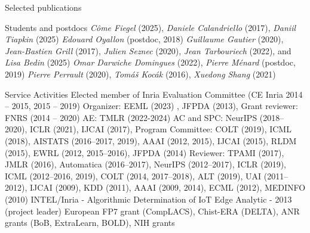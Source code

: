 \documentclass{resume}
\begin{document}
\begin{category}{Selected publications}



  

\end{category}
\vspace{-0.5cm}
\begin{category}{Students and postdocs}
\citemnobullet 
\textit{C\^{o}me Fiegel} (2025),
\textit{Daniele Calandriello} (2017), 
\textit{Daniil Tiapkin} (2025) 
\textit{Edouard Oyallon} (postdoc, 2018)
\textit{Guillaume Gautier} (2020),
\textit{Jean-Bastien Grill} (2017), 
\textit{Julien Seznec} (2020), 
\textit{Jean Tarbouriech} (2022), and
\textit{Lisa Bedin} (2025) 
\textit{Omar Darwiche Domingues} (2022), 
\textit{Pierre M\'enard} (postdoc, 2019)
\textit{Pierre Perrault} (2020), 
\textit{Tom\'a\v s Koc\' ak} (2016),
\textit{Xuedong Shang} (2021)

\end{category}
\vspace{-0.5cm}
\begin{category}{Service Activities}
\setlength\itemsep{0.15em}
\citembullet Elected member of Inria Evaluation Committee (CE Inria 2014 -- 2015, 2015 -- 2019)
\citembullet Organizer: EEML (2023) , JFPDA (2013),  Grant reviewer: FNRS (2014 -- 2020)
\citembullet AE: TMLR (2022-2024) AC and SPC: NeurIPS (2018--2020), ICLR (2021),  IJCAI (2017), Program Committee: COLT (2019), ICML (2018), AISTATS (2016--2017, 2019), AAAI (2012, 2015), IJCAI (2015), RLDM (2015), EWRL 
(2012, 2015--2016), JFPDA (2014)
\citembullet  Reviewer: TPAMI (2017), JMLR (2016), Automatica (2016--2017), NeurIPS (2012--2017), ICLR (2019), ICML (2012--2016, 2019), COLT
(2014, 2017--2018), ALT (2019), UAI (2011--2012), IJCAI (2009), KDD (2011), AAAI (2009, 2014), ECML
(2012), MEDINFO (2010)
\citembullet INTEL/Inria - Algorithmic Determination of IoT Edge Analytic -
2013 (project leader)
\citembullet  European FP7 grant (CompLACS), Chist-ERA (DELTA), ANR grants (BoB, ExtraLearn, BOLD), NIH grants
\end{category}
\end{document}
